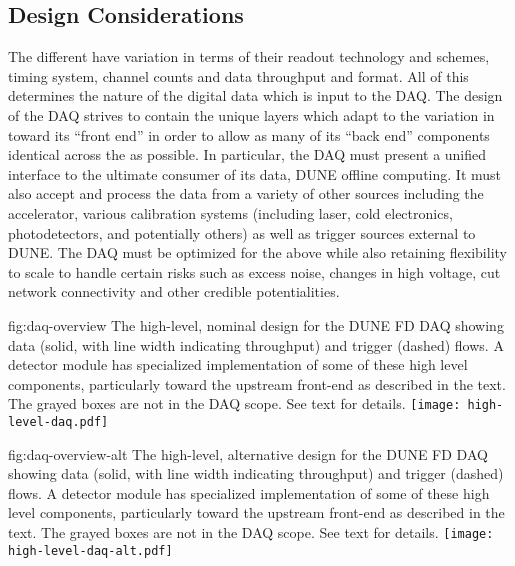 \subsection{Design Considerations}
\label{sec:fd-daq-des-consid}

The different  have variation in terms of their
readout technology and schemes, timing system, channel counts and data
throughput and format.
All of this determines the nature of the digital data which is input
to the DAQ. 
The design of the DAQ strives to contain the unique layers which adapt
to the variation in  toward its ``front end'' in
order to allow as many of its ``back end'' components identical across
the  as possible. 
In particular, the DAQ must present a unified interface to the
ultimate consumer of its data, DUNE offline computing.
It must also accept and process the data from a variety of other
sources including the accelerator, various calibration systems
(including laser, cold electronics, photodetectors, and potentially
others) as well as trigger sources external to DUNE. 
The DAQ must be optimized for the above while also retaining
flexibility to scale to handle certain risks such as excess noise,
changes in high voltage, cut network connectivity and other credible
potentialities.

\begin{dunefigure}{fig:daq-overview}
  {The high-level, nominal design for the DUNE FD DAQ showing data (solid, with
    line width indicating throughput) and trigger (dashed) flows. 
    A detector module has specialized implementation of some of these
    high level components, particularly toward the upstream front-end
    as described in the text. 
    The grayed boxes are not in the DAQ scope.
    See text for details.
}
\texttt{[image: high-level-daq.pdf]}%
\end{dunefigure}

\begin{dunefigure}{fig:daq-overview-alt}
  {The high-level, alternative design for the DUNE FD DAQ showing data (solid, with
    line width indicating throughput) and trigger (dashed) flows. 
    A detector module has specialized implementation of some of these
    high level components, particularly toward the upstream front-end
    as described in the text. 
    The grayed boxes are not in the DAQ scope.
    See text for details.
}
\texttt{[image: high-level-daq-alt.pdf]}%
\end{dunefigure}

